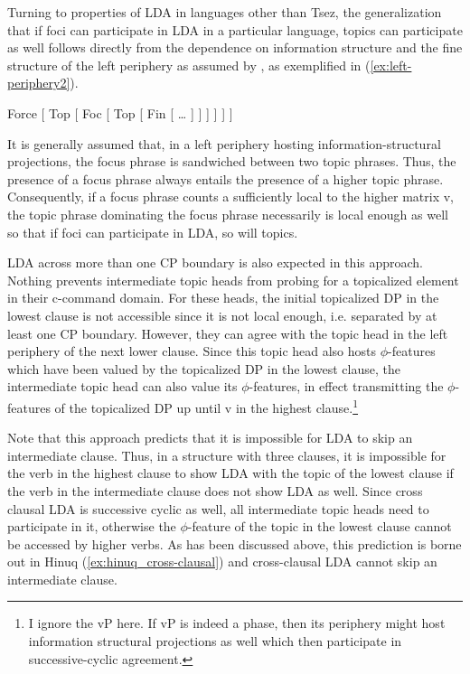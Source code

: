 \documentclass[output=paper
,modfonts
,nonflat]{langsci/langscibook}
\begin{document}
Turning to properties of LDA in languages other than Tsez, the generalization that if foci can participate in LDA in a particular language, topics can participate as well follows directly from the dependence on information structure and the fine structure of the left periphery as assumed by \citet{Rizzi1997}, as exemplified in (\ref{ex:left-periphery2}).
\begin{exe} \label{ex:left-periphery2}
	\ex {[} Force [ Top [ Foc [ Top [ Fin [ {\ldots} ] ] ] ] ] ] 
\end{exe}
It is generally assumed that, in a left periphery hosting information-structural projections, the focus phrase is sandwiched between two topic phrases. Thus, the presence of a focus phrase always entails the presence of a higher topic phrase. Consequently, if a focus phrase counts a sufficiently local to the higher matrix v, the  topic phrase dominating the focus phrase necessarily is local enough as well so that if foci can participate in LDA, so will topics.

LDA across more than one CP boundary is also expected in this approach. Nothing prevents intermediate topic heads from probing for a topicalized element in their c-command domain. For these heads, the initial topicalized DP in the lowest clause is not accessible since it is not local enough, i.e. separated by at least one CP boundary. However, they can agree with the topic head in the left periphery of the next lower clause. Since this topic head also hosts $ \phi $-features which have been valued by the topicalized DP in the lowest clause, the intermediate topic head can also value its $ \phi $-features, in effect transmitting the $ \phi $-features of the topicalized DP up until v in the highest clause.\footnote{I ignore the vP here. If vP is indeed a phase, then its periphery might host information structural projections as well which then participate in successive-cyclic agreement.}

Note that this approach predicts that it is impossible for LDA to skip an intermediate clause. Thus, in a structure with three clauses, it is impossible for the verb in the highest clause to show LDA with the topic of the lowest clause if the verb in the intermediate clause does not show LDA as well. Since cross clausal LDA is successive cyclic as well, all intermediate topic heads need to participate in it, otherwise the $ \phi $-feature of the topic in the lowest clause cannot be accessed by higher verbs. As has been discussed above, this prediction is borne out in Hinuq (\ref{ex:hinuq_cross-clausal}) and cross-clausal LDA cannot skip an intermediate clause.
\end{document}
